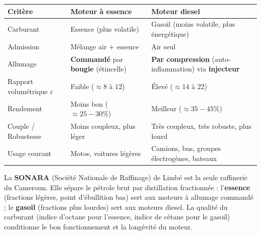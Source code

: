 \documentclass[11pt]{article}
\begin{document}
\begin{center}
\begin{tabularx}{\linewidth}{|l|X|X|}\hline
\rowcolor{popblueL}
\textbf{Critère} & \textbf{Moteur à essence} & \textbf{Moteur diesel} \\ \hline
Carburant & Essence (plus volatile) & Gasoil (moins volatile, plus énergétique) \\ \hline
Admission & Mélange air + essence & Air seul \\ \hline
Allumage & \textbf{Commandé} par \textbf{bougie} (étincelle) & \textbf{Par compression} (auto-inflammation) via \textbf{injecteur} \\ \hline
Rapport volumétrique $\varepsilon$ & Faible ($\approx 8$ à $12$) & Élevé ($\approx 14$ à $22$) \\ \hline
Rendement & Moins bon ($\approx 25-30\%$) & Meilleur ($\approx 35-45\%$) \\ \hline
Couple / Robustesse & Moins coupleux, plus léger & Très coupleux, très robuste, plus lourd \\ \hline
Usage courant & Motos, voitures légères & Camions, bus, groupes électrogènes, bateaux \\ \hline
\end{tabularx}
\end{center}

\begin{savaistu}
La \textbf{SONARA} (Société Nationale de Raffinage) de Limbé est la seule raffinerie du Cameroun. Elle sépare le pétrole brut par distillation fractionnée : l'\textbf{essence} (fractions légères, point d'ébullition bas) sert aux moteurs à allumage commandé ; le \textbf{gasoil} (fractions plus lourdes) sert aux moteurs diesel. La qualité du carburant (indice d'octane pour l'essence, indice de cétane pour le gasoil) conditionne le bon fonctionnement et la longévité du moteur.
\end{savaistu}
\end{document}
